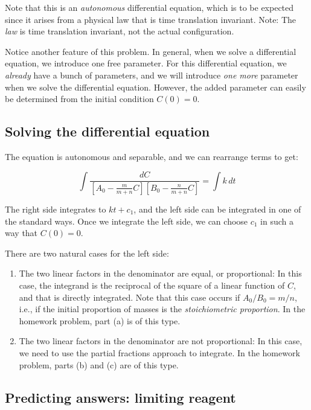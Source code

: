 \documentclass{amsart}
\begin{document}
Note that this is an {\em autonomous} differential equation, which is
to be expected since it arises from a physical law that is time
translation invariant. Note: The {\em law} is time translation
invariant, not the actual configuration.

Notice another feature of this problem. In general, when we solve a
differential equation, we introduce one free parameter. For this
differential equation, we {\em already} have a bunch of parameters,
and we will introduce {\em one more} parameter when we solve the
differential equation. However, the added parameter can easily be
determined from the initial condition $C(0) = 0$.

\subsection{Solving the differential equation}

The equation is autonomous and separable, and we can rearrange terms to get:

$$\int \frac{dC}{\left[A_0 - \frac{m}{m + n}C \right]\left[B_0 - \frac{n}{m + n}C \right]} = \int k \, dt$$

The right side integrates to $kt + c_1$, and the left side can be
integrated in one of the standard ways. Once we integrate the left
side, we can choose $c_1$ in such a way that $C(0) = 0$.

There are two natural cases for the left side:

\begin{enumerate}
\item The two linear factors in the denominator are equal, or
  proportional: In this case, the integrand is the reciprocal of the
  square of a linear function of $C$, and that is directly
  integrated. Note that this case occurs if $A_0/B_0 = m/n$, i.e., if
  the initial proportion of masses is the {\em stoichiometric
  proportion}. In the homework problem, part (a) is of this type.
\item The two linear factors in the denominator are not proportional:
  In this case, we need to use the partial fractions approach to
  integrate. In the homework problem, parts (b) and (c) are of this type.
\end{enumerate}

\subsection{Predicting answers: limiting reagent}
\end{document}
